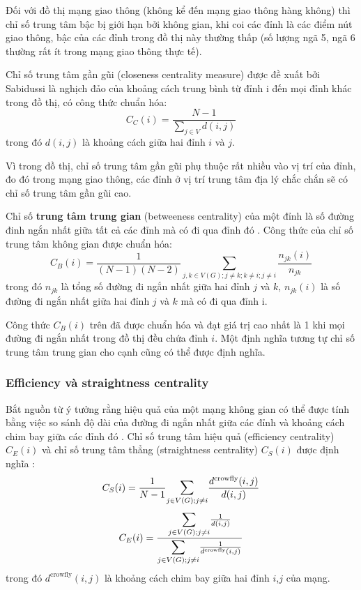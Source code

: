 \documentclass[14pt, oneside, a4paper, openany]{scrartcl}
\begin{document}
Đối với đồ thị mạng giao thông (không kể đến mạng giao thông hàng không) thì chỉ số trung tâm bậc bị giới hạn bởi không gian, khi coi các đỉnh là các điểm nút giao thông, bậc của các đỉnh trong đồ thị này thường thấp (số lượng ngã 5, ngã 6 thường rất ít trong mạng giao thông thực tế).

Chỉ số trung tâm gần gũi (closeness centrality measure) được đề xuất bởi Sabidussi \cite{centrali03} là nghịch đảo của khoảng cách trung bình từ đỉnh i đến mọi đỉnh khác trong đồ thị, có công thức chuẩn hóa:
\begin{equation}
C_C(i) = \frac{N-1}{\sum_{j \in V} d(i,j)}
\end{equation}
trong đó $d(i,j)$ là khoảng cách giữa hai đỉnh $i$ và $j$.

Vì trong đồ thị, chỉ số trung tâm gần gũi phụ thuộc rất nhiều vào vị trí của đỉnh, đo đó trong mạng giao thông, các đỉnh ở vị trí trung tâm địa lý chắc chắn sẽ có chỉ số trung tâm gần gũi cao.

Chỉ số \textbf{trung tâm trung gian}  (betweeness centrality) của một đỉnh là số đường đinh ngắn nhất giữa tất cả các đỉnh mà có đi qua đỉnh đó \cite{centrali02}. Công thức của chỉ số trung tâm không gian được chuẩn hóa:
\begin{equation}
	C_B(i) = \frac{1}{(N-1)(N-2)} \sum_{j,k \in V(G); j \neq k; k\neq i; j \neq i} \frac{n_{jk}(i)}{n_{jk}}
\end{equation}
trong đó $n_{jk}$ là tổng số đường đi ngắn nhất giữa hai đỉnh $j$ và $k$, $n_{jk}(i)$ là số đường đi ngắn nhất giữa hai đỉnh $j$ và $k$ mà có đi qua đỉnh i.

Công thức $C_B(i)$ trên đã được chuẩn hóa và đạt giá trị cao nhất là 1 khi mọi đường đi ngắn nhất trong đồ thị đều chứa đỉnh $i$. Một định nghĩa tương tự chỉ số trung tâm trung gian cho cạnh cũng có thể được định nghĩa.

\subsubsection{Efficiency và straightness centrality}
Bắt nguồn từ ý tưởng rằng hiệu quả của một mạng không gian có thể được tính bằng việc so sánh độ dài của đường đi ngắn nhất giữa các đỉnh và khoảng cách chim bay giữa các đỉnh đó \cite{efficiency01}. Chỉ số trung tâm hiệu quả (efficiency centrality) $C_E(i)$ và chỉ số trung tâm thẳng (straightness centrality) $C_S(i)$ được định nghĩa \cite{efficiency02}:
\begin{equation}
C_S(i) = \frac{1}{N-1} \mathlarger{\sum}_{j \in V(G); j \neq i} \frac{d^{\text{crowfly}}(i,j)}{d(i,j)}
\end{equation}
\begin{equation}
	C_E(i) = \frac{\mathlarger{\sum}_{j \in V(G); j \neq i}\frac{1}{d(i,j)}}{\mathlarger{\sum}_{j \in V(G); j \neq i}\frac{1}{d^{\text{crowfly}}(i,j)}}
\end{equation}
trong đó $d^{\text{crowfly}}(i,j)$ là khoảng cách chim bay giữa hai đỉnh $i$,$j$ của mạng.
\end{document}

